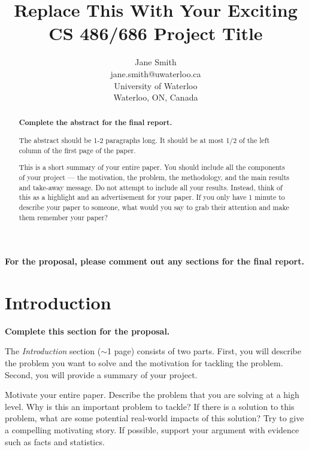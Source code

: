 \documentclass[letterpaper]{article} %
\begin{document}
%
\title{Replace This With Your Exciting CS 486/686 Project Title}
\author{Jane Smith\\
jane.smith@uwaterloo.ca\\
University of Waterloo\\
Waterloo, ON, Canada\\
}
\maketitle


{\bf For the proposal, please comment out any sections for the final report.}

\begin{abstract}
{\bf Complete the abstract for the final report.}

The abstract should be 1-2 paragraphs long. It should be at most 1/2 of the left column of the first page of the paper.

This is a short summary of your entire paper. You should include all the components of your project --- the motivation, the problem, the methodology, and the main results and take-away message. Do not attempt to include all your results. Instead, think of this as a highlight and an advertisement for your paper. If you only have 1 minute to describe your paper to someone, what would you say to grab their attention and make them remember your paper?

\end{abstract}


\section{Introduction} 

{\bf Complete this section for the proposal.}

The {\it Introduction} section ($\sim$1 page) consists of two parts. First, you will describe the problem you want to solve and the motivation for tackling the problem. Second, you will provide a summary of your project. 

Motivate your entire paper. Describe the problem that you are solving at a high level. Why is this an important problem to tackle? If there is a solution to this problem, what are some potential real-world impacts of this solution? Try to give a compelling motivating story. If possible, support your argument with evidence such as facts and statistics. 
\end{document}
